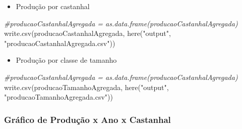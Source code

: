 \documentclass[
]{article}
\newenvironment{Shaded}{\begin{snugshade}}{\end{snugshade}}
\newcommand{\CommentTok}[1]{\textcolor[rgb]{0.56,0.35,0.01}{\textit{#1}}}
\newcommand{\FunctionTok}[1]{\textcolor[rgb]{0.00,0.00,0.00}{#1}}
\newcommand{\NormalTok}[1]{#1}
\newcommand{\OtherTok}[1]{\textcolor[rgb]{0.56,0.35,0.01}{#1}}
\newcommand{\SpecialCharTok}[1]{\textcolor[rgb]{0.00,0.00,0.00}{#1}}
\newcommand{\StringTok}[1]{\textcolor[rgb]{0.31,0.60,0.02}{#1}}
\providecommand{\tightlist}{%
  \setlength{\itemsep}{0pt}\setlength{\parskip}{0pt}}
\begin{document}
\begin{itemize}
\tightlist
\item
  Produção por castanhal
\end{itemize}

\begin{Shaded}
\begin{Highlighting}[]
\CommentTok{\#producaoCastanhalAgregada = as.data.frame(producaoCastanhalAgregada)}
\FunctionTok{write.csv}\NormalTok{(producaoCastanhalAgregada, }\FunctionTok{here}\NormalTok{(}\StringTok{"output"}\NormalTok{, }\StringTok{"producaoCastanhalAgregada.csv"}\NormalTok{))}
\end{Highlighting}
\end{Shaded}

\begin{itemize}
\tightlist
\item
  Produção por classe de tamanho
\end{itemize}

\begin{Shaded}
\begin{Highlighting}[]
\CommentTok{\#producaoCastanhalAgregada = as.data.frame(producaoCastanhalAgregada)}
\FunctionTok{write.csv}\NormalTok{(producaoTamanhoAgregada, }\FunctionTok{here}\NormalTok{(}\StringTok{"output"}\NormalTok{, }\StringTok{"producaoTamanhoAgregada.csv"}\NormalTok{))}
\end{Highlighting}
\end{Shaded}

\hypertarget{gruxe1fico-de-produuxe7uxe3o-x-ano-x-castanhal}{%
\subsubsection{Gráfico de Produção x Ano x
Castanhal}\label{gruxe1fico-de-produuxe7uxe3o-x-ano-x-castanhal}}

\begin{Shaded}
\end{Shaded}
\end{document}
